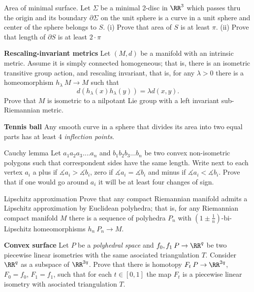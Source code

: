 \begin{pr}{}{Area of minimal surface.} Let $\Sigma$ be a minimal 2-disc in $\RR^3$ which passes thru the origin and its boundary $\partial\Sigma$ on the unit sphere is a curve in a unit sphere and center of the sphere belongs to $S$.
(i) Prove that area of $S$ is at least $\pi$.
(ii) Prove that length of $\partial S$ is at least $2\cdot\pi$
\end{pr}

\begin{pr}
{\bf  Rescaling-invariant metrics} Let $(M,d)$ be a manifold with an intrinsic metric. 
Assume it is simply connected homogeneous; 
that is, there is an isometric transitive group action, and rescaling invariant, 
that is, for any $\lambda>0$ there is a homeomorphism $h_\lambda\:M\to M$ such that $$d(h_\lambda(x)h_\lambda(y))=\lambda d(x,y).$$
Prove that $M$ is isometric to a nilpotant Lie group with a left invariant sub-Riemannian metric.
\end{pr}

\begin{pr}
{\bf  Tennis ball} \cite{arnold}\cite{angenent} Any smooth curve in a sphere that divides its area into two equal parts has at least 4 {\it inflection points}.
\end{pr}

\begin{pr}{\easy}{Cauchy lemma} Let $a_1a_2a_3....a_n$ and $b_1b_2b_3...b_n$ be two convex non-isometric polygons such that correspondent sides have the same length.
Write next to each vertex $a_i$  a plus if $\measuredangle a_i>\measuredangle b_i$, zero if  $\measuredangle a_i=\measuredangle b_i$ and minus if $\measuredangle a_i<\measuredangle b_i$.
Prove that if one would go around $a_i$ it will be at least four changes of sign.
\end{pr}

\begin{pr}{}{Lipschitz approximation}
Prove that any compact Riemannian manifold admits a Lipschitz approximation by Euclidean polyhedra; 
that is, for any Riemannian compact manifold $M$ there is a sequence of polyhedra $P_n$ with $(1\pm\tfrac1n)$-bi-Lipschitz homeomorphisms $h_n\:P_n\to M$.
\end{pr}

\begin{pr}{}
{\bf  Convex surface}
Let $P$ be a \emph{polyhedral space} and $f_0,f_1\:P\to \RR^q$ be two piecewise linear isometries with the same asociated triangulation $T$.
Consider $\RR^q$ as a subspace of $\RR^{2q}$.
Prove that there is homotopy $F_t\:P\to\RR^{2q}$, $F_0=f_0$, $F_1=f_1$, such that for each $t\in[0,1]$ the map $F_t$ is a piecewise linear isometry with asociated triangulation $T$.
\end{pr}

